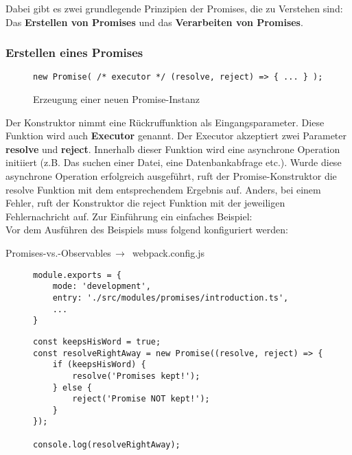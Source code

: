 \noindent
Dabei gibt es zwei grundlegende Prinzipien der Promises, die zu Verstehen sind: Das \textbf{Erstellen von Promises} und das \textbf{Verarbeiten von Promises}.

\subsubsection{Erstellen eines Promises}

\begin{figure}[H]
\begin{lstlisting}
new Promise( /* executor */ (resolve, reject) => { ... } );
\end{lstlisting}
\caption{Erzeugung einer neuen Promise-Instanz}
\end{figure}

Der Konstruktor nimmt eine Rückruffunktion als Eingangsparameter. Diese Funktion wird auch \textbf{Executor} genannt.\cite{promise-executor} Der Executor akzeptiert zwei Parameter \textbf{resolve} und \textbf{reject}. Innerhalb dieser Funktion wird eine asynchrone Operation initiiert (z.B. Das suchen einer Datei, eine Datenbankabfrage etc.). Wurde diese asynchrone Operation erfolgreich ausgeführt, ruft der Promise-Konstruktor die resolve Funktion mit dem entsprechendem Ergebnis auf. Anders, bei einem Fehler, ruft der Konstruktor die reject Funktion mit der jeweiligen Fehlernachricht auf. Zur Einführung ein einfaches Beispiel:\\

\noindent
Vor dem Ausführen des Beispiels muss folgend konfiguriert werden:

 \begin{center}
     Promises-vs.-Observables$\,\to\,$ webpack.config.js
 \end{center}

\begin{figure}[H]
\begin{lstlisting}
module.exports = {
    mode: 'development',
    entry: './src/modules/promises/introduction.ts',
    ...
}
\end{lstlisting}
\end{figure}

\begin{figure}[H]
\begin{lstlisting}
const keepsHisWord = true;
const resolveRightAway = new Promise((resolve, reject) => {
    if (keepsHisWord) {
        resolve('Promises kept!');
    } else {
        reject('Promise NOT kept!');
    }
});

console.log(resolveRightAway);
\end{lstlisting}
\end{figure}

